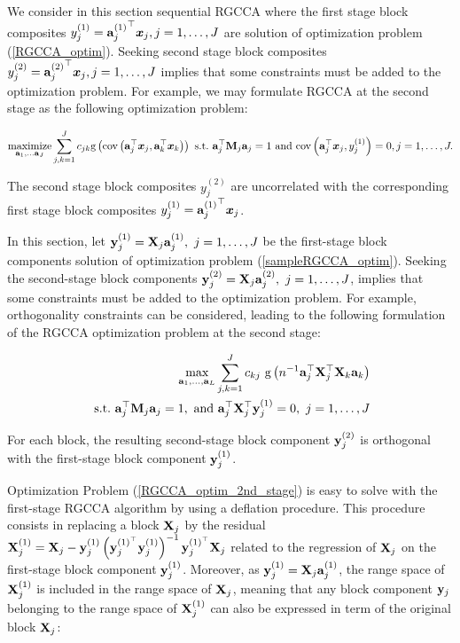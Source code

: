 \documentclass[
]{jss}
\begin{document}
We consider in this section sequential RGCCA where the first stage block
composites
\(y_j^{(1)}={\mathbf{a}_j^{(1)}}^\top \boldsymbol x_j, j=1, \ldots, J\) are
solution of optimization problem (\ref{RGCCA_optim}). Seeking second
stage block composites
\(y_j^{(2)}={\mathbf{a}_j^{(2)}}^\top \boldsymbol x_j, j=1, \ldots, J\)
implies that some constraints must be added to the optimization problem.
For example, we may formulate RGCCA at the second stage as the following
optimization problem:

\begin{equation}
\underset{\mathbf{a}_1, \ldots \mathbf{a}_J}{\text{maximize}} \sum_{j,k=1}^J c_{jk} \text{g}\left(\text{cov}\left(\mathbf{a}_j^\top \boldsymbol x_j, \mathbf{a}_k^\top \boldsymbol x_k \right)\right) \text{~s.t.~} \mathbf{a}_j^\top \mathbf{M}_j \mathbf{a}_j = 1 \text{~and~}\text{cov}\left(\mathbf{a}_j^\top \boldsymbol x_j,y_j^{(1)} \right) = 0 , j=1, \ldots, J.
\label{RGCCA_optim_dfl}
\end{equation}

The second stage block composites \(y_j^{(2)}\) are uncorrelated with
the corresponding first stage block composites
\(y_j^{(1)}={\mathbf{a}_j^{(1)}}^\top \boldsymbol x_j\).

In this section, let
\(\mathbf{y}_j^{(1)} = \mathbf{X}_j\mathbf{a}_j^{(1)}, ~ j = 1, \ldots, J\) be the
first-stage block components solution of optimization problem
(\ref{sampleRGCCA_optim}). Seeking the second-stage block components
\(\mathbf{y}_j^{(2)} = \mathbf{X}_j\mathbf{a}_j^{(2)}, ~ j = 1, \ldots, J\), implies that
some constraints must be added to the optimization problem. For example,
orthogonality constraints can be considered, leading to the following
formulation of the RGCCA optimization problem at the second stage:

\begin{equation}
\begin{split}
        \underset{\mathbf{a}_1, \ldots,\mathbf{a}_L}{\text{max}} \sum_{j, k = 1}^J c_{kj} \text{ g}\left(n^{-1}\mathbf{a}_j^\top \mathbf{X}_j ^\top \mathbf{X}_k \mathbf{a}_k \right)
        \\
        \text{~s.t.~} \mathbf{a}_j^\top\mathbf{M}_j \mathbf{a}_j = 1,~\text{and}~\mathbf{a}_j^\top\mathbf{X}_j^\top\mathbf{y}_j^{(1)} = 0, ~j = 1, \ldots, J
\end{split}
\label{RGCCA_optim_2nd_stage}
\end{equation}

For each block, the resulting second-stage block component
\(\mathbf{y}_j^{(2)}\) is orthogonal with the first-stage block component
\(\mathbf{y}_j^{(1)}\).

Optimization Problem (\ref{RGCCA_optim_2nd_stage}) is easy to solve with
the first-stage RGCCA algorithm by using a deflation procedure. This
procedure consists in replacing a block \(\mathbf{X}_j\) by the residual
\(\mathbf{X}_j^{(1)} = \mathbf{X}_j - \mathbf{y}_j^{(1)} \left( \mathbf{y}_j^{(1)^\top} \mathbf{y}_j^{(1)} \right)^{-1}\mathbf{y}_j^{(1)^\top}\mathbf{X}_j\)
related to the regression of \(\mathbf{X}_j\) on the first-stage block component
\(\mathbf{y}_j^{(1)}\). Moreover, as \(\mathbf{y}_j^{(1)} = \mathbf{X}_j\mathbf{a}_j^{(1)}\), the
range space of \(\mathbf{X}_j^{(1)}\) is included in the range space of
\(\mathbf{X}_j\), meaning that any block component \(\mathbf{y}_j\) belonging to the
range space of \(\mathbf{X}_j^{(1)}\) can also be expressed in term of the
original block \(\mathbf{X}_j\):
\end{document}
